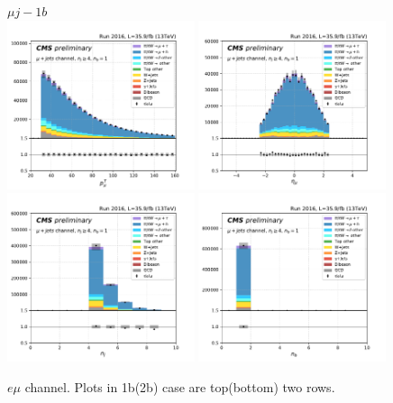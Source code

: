 \begin{figure}[ht]
    \centering
    $\mu j- 1b$ \\
    \includegraphics[width=0.49\textwidth]{chapters/Appendix/sectionPlots/figures/kinematics_pickles/mu4j/1b/mu4j_1b_lepton1_pt.pdf}
    \includegraphics[width=0.49\textwidth]{chapters/Appendix/sectionPlots/figures/kinematics_pickles/mu4j/1b/mu4j_1b_lepton1_eta.pdf}
    \includegraphics[width=0.49\textwidth]{chapters/Appendix/sectionPlots/figures/kinematics_pickles/mu4j/1b/mu4j_1b_nJets.pdf}
    \includegraphics[width=0.49\textwidth]{chapters/Appendix/sectionPlots/figures/kinematics_pickles/mu4j/1b/mu4j_1b_nBJets.pdf}
    
    \caption{$e\mu$ channel. Plots in 1b(2b) case are top(bottom) two rows.}
\end{figure}

